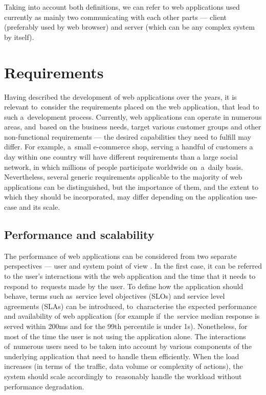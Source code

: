 Taking into account both definitions, we can refer to web applications used currently as mainly two communicating with each other parts --- client (preferably used by web browser) and server (which can be any complex system by itself).

\section{Requirements} \label{chapter:web-apps-requirements}

Having described the development of web applications over the years, it is relevant to~consider the requirements placed on the web application, that lead to such a~development process. Currently, web applications can operate in numerous areas, and~based on the business needs, target various customer groups and other non-functional requirements --- the desired capabilities they need to fulfill may differ. For example, a~small e-commerce shop, serving a handful of customers a day within one country will have different requirements than a large social network, in which millions of people participate worldwide on~a~daily basis. Nevertheless, several generic requirements applicable to the majority of web applications can be distinguished, but the importance of them, and the extent to which they should be incorporated, may differ depending on the application use-case and its scale.

\subsection{Performance and scalability}

The performance of web applications can be considered from two separate perspectives --- user and system point of view \cite{DesignDataIntensiveApplications}. In the first case, it can be referred to the user's interactions with the web application and the time that it needs to respond to~requests made by the user. To define how the application should behave, terms such as~service level objectives (SLOs) and service level agreements (SLAs) can be introduced, to~characterise the expected performance and availability of web application (for example if~the~service median response is served within 200ms and for the 99th percentile is under 1s). Nonetheless, for most of the time the user is not using the application alone. The interactions of~numerous users need to be taken into account by various components of the underlying application that need to handle them efficiently. When the load increases (in terms of~the traffic, data volume or complexity of actions), the system should scale accordingly to~reasonably handle the workload without performance degradation. 


